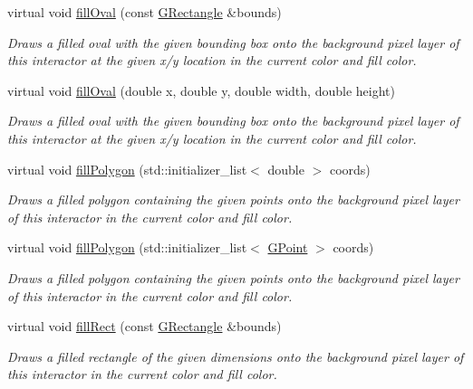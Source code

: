 \begin{DoxyCompactItemize}
virtual void \mbox{\hyperlink{classGDrawingSurface_a1ea6e48d59fb588797dba4deab1397e0}{fill\+Oval}} (const \mbox{\hyperlink{structGRectangle}{G\+Rectangle}} \&bounds)
\begin{DoxyCompactList}\small\item\em Draws a filled oval with the given bounding box onto the background pixel layer of this interactor at the given x/y location in the current color and fill color. \end{DoxyCompactList}\item 
virtual void \mbox{\hyperlink{classGDrawingSurface_a28c700c82f31cd328a4629273420ee61}{fill\+Oval}} (double x, double y, double width, double height)
\begin{DoxyCompactList}\small\item\em Draws a filled oval with the given bounding box onto the background pixel layer of this interactor at the given x/y location in the current color and fill color. \end{DoxyCompactList}\item 
virtual void \mbox{\hyperlink{classGDrawingSurface_a15f8c1c4409ef51c1a30a92a195b8f66}{fill\+Polygon}} (std\+::initializer\+\_\+list$<$ double $>$ coords)
\begin{DoxyCompactList}\small\item\em Draws a filled polygon containing the given points onto the background pixel layer of this interactor in the current color and fill color. \end{DoxyCompactList}\item 
virtual void \mbox{\hyperlink{classGDrawingSurface_a31822d59786156ebf1cc3b2f7fb70330}{fill\+Polygon}} (std\+::initializer\+\_\+list$<$ \mbox{\hyperlink{structGPoint}{G\+Point}} $>$ coords)
\begin{DoxyCompactList}\small\item\em Draws a filled polygon containing the given points onto the background pixel layer of this interactor in the current color and fill color. \end{DoxyCompactList}\item 
virtual void \mbox{\hyperlink{classGDrawingSurface_ae6582295003bf2488836b1993dadbad7}{fill\+Rect}} (const \mbox{\hyperlink{structGRectangle}{G\+Rectangle}} \&bounds)
\begin{DoxyCompactList}\small\item\em Draws a filled rectangle of the given dimensions onto the background pixel layer of this interactor in the current color and fill color. \end{DoxyCompactList}\item 

\end{DoxyCompactItemize}

